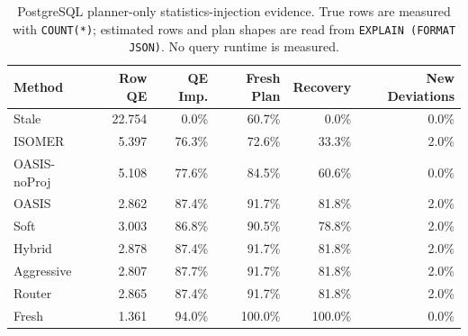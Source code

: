 \begin{table}[t]
  \centering
  \small
  \caption{PostgreSQL planner-only statistics-injection evidence. True rows are measured with \texttt{COUNT(*)}; estimated rows and plan shapes are read from \texttt{EXPLAIN (FORMAT JSON)}. No query runtime is measured.}
  \label{tab:postgres_planner_stats_injection}
  \setlength{\tabcolsep}{4pt}
  \begin{tabular}{lrrrrr}
    \toprule
    Method & Row QE & QE Imp. & Fresh Plan & Recovery & New Deviations \\
    \midrule
    Stale & 22.754 & 0.0\% & 60.7\% & 0.0\% & 0.0\% \\
    ISOMER & 5.397 & 76.3\% & 72.6\% & 33.3\% & 2.0\% \\
    OASIS-noProj & 5.108 & 77.6\% & 84.5\% & 60.6\% & 0.0\% \\
    OASIS & 2.862 & 87.4\% & 91.7\% & 81.8\% & 2.0\% \\
    Soft & 3.003 & 86.8\% & 90.5\% & 78.8\% & 2.0\% \\
    Hybrid & 2.878 & 87.4\% & 91.7\% & 81.8\% & 2.0\% \\
    Aggressive & 2.807 & 87.7\% & 91.7\% & 81.8\% & 2.0\% \\
    Router & 2.865 & 87.4\% & 91.7\% & 81.8\% & 2.0\% \\
    Fresh & 1.361 & 94.0\% & 100.0\% & 100.0\% & 0.0\% \\
    \bottomrule
  \end{tabular}
\end{table}
